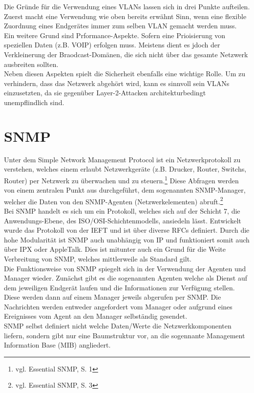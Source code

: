 Die Gründe für die Verwendung eines VLANs lassen sich in drei Punkte aufteilen.
Zuerst macht eine Verwendung wie oben bereits erwähnt Sinn, wenn eine flexible Zuordnung eines Endgerätes immer zum selben VLAN gemacht werden muss.\\
Ein weitere Grund sind Prformance-Aspekte. Sofern eine Prioisierung von speziellen Daten (z.B. VOIP) erfolgen muss. Meistens dient es jdoch der Verkleinerung der Braodcast-Domänen, die sich nicht über das gesamte Netzwerk ausbreiten sollten.\\
Neben diesen Aspekten spielt die Sicherheit ebenfalls eine wichtige Rolle. Um zu verhindern, dass das Netzwerk abgehört wird, kann es sinnvoll sein VLANs einzusetzten, da sie gegenüber Layer-2-Attacken architekturbedingt unempflindlich sind.


\section{SNMP}
\label{sec:snmp}
Unter dem Simple Network Management Protocol ist ein Netzwerkprotokoll zu verstehen, welches einem erlaubt Netzwerkgeräte (z.B. Drucker, Router, Switchs, Router) per Netzwerk zu überwachen und zu steuern.\footnote{vgl. Essential SNMP, S. 1}
Diese Abfragen werden von einem zentralen Punkt aus durchgeführt, dem sogenannten SNMP-Manager, welcher die Daten von den SNMP-Agenten (Netzwerkelementen) abruft.\footnote{vgl. Essential SNMP, S. 3}\\
Bei SNMP handelt es sich um ein Protokoll, welches sich auf der Schicht 7, die Anwendungs-Ebene, des ISO/OSI-Schichtenmodells, ansiedeln lässt.
Entwickelt wurde das Protokoll von der IEFT und ist über diverse RFCs definiert.
Durch die hohe Modularität ist SNMP auch unabhängig von IP und funktioniert somit auch über IPX oder AppleTalk. Dies ist mitunter auch ein Grund für die Weite Verbreitung von SNMP, welches mittlerweile als Standard gilt.\\
Die Funktionsweise von  SNMP spiegelt sich in der Verwendung der Agenten und Manager wieder.
Zunächst gibt es die sogenannten Agenten welche als Dienst auf dem jeweiligen Endgerät laufen und die Informationen zur Verfügung stellen. Diese werden dann auf einem Manager jeweils abgerufen per SNMP. Die Nachrichten werden entweder angefordert vom Manager oder aufgrund eines Ereignisses vom Agent an den Manager selbständig gesendet.\\
SNMP selbst definiert nicht welche Daten/Werte die Netzwerkkomponenten liefern, sondern gibt nur eine Baumstruktur vor, an die sogennante Management Information Base (MIB) angliedert.
